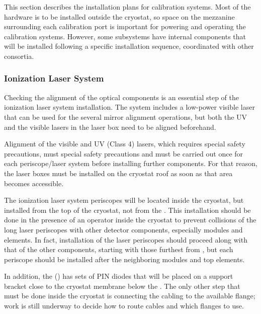 
This section describes the installation plans for calibration systems. Most of the hardware is to be installed outside the cryostat, so space on the mezzanine surrounding each calibration port is important for powering and operating the calibration systems. However, some subsystems have internal components that will be installed %
following a specific installation sequence, coordinated with other consortia.

\subsubsection{Ionization Laser System} 

Checking the alignment of the optical components is an essential step of the ionization laser system installation. The system includes a low-power visible laser that can be used for the several mirror alignment operations, but %
both the UV and the visible lasers in the laser box need to be aligned beforehand.

Alignment of the visible and UV (Class 4) lasers, which requires special safety precautions, must special safety precautions and must be carried out once for each periscope/laser system before installing further  components. For that reason, the laser boxes must be installed on the cryostat roof as soon as that area becomes accessible.  

The ionization laser system periscopes will be located inside the cryostat, but installed from the top of the cryostat, not from the . This installation should be done in the presence of an operator inside the cryostat to prevent collisions of the long laser periscopes with other detector components, especially  modules and  elements. In fact, installation of the laser periscopes should proceed along with that of the other components, starting with those furthest from , but each periscope should be installed after the neighboring  modules and top  elements.


In addition, the  () has sets of PIN diodes that will be placed on a support bracket close to the cryostat membrane below the . The only other step that must be done inside the cryostat
is connecting the cabling to the available flange; work is still underway to decide how to route cables and which flanges to use. 

